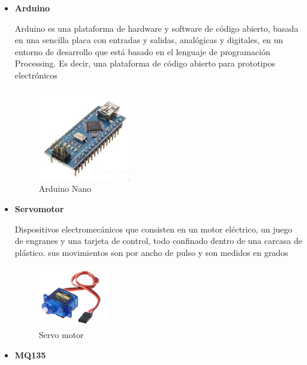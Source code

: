 \documentclass[letterpaper,12pt]{article}
\begin{document}
{\begin{itemize}
\begin{figure}[h]
	\end{figure}


	\item \textbf{Arduino}

	Arduino es una plataforma de hardware y software de código abierto, basada en una sencilla placa con entradas y salidas, analógicas y digitales, en un entorno de desarrollo que está basado en el lenguaje de programación Processing. Es decir, una plataforma de código abierto para prototipos electrónicos
	
	\begin{figure}[h]
		\centering
		\begin{minipage}[t]{5cm}
			\includegraphics[width=4cm]{images/arduino.jpeg}	 %
			\caption{ Arduino Nano}
		\end{minipage}
		
	\end{figure}


	

	\item \textbf{Servomotor}
	
	Dispositivos electromecánicos que consisten en un motor eléctrico, un juego de engranes y una tarjeta de control, todo confinado dentro de una carcasa de plástico. sus movimientos son por ancho de pulso y son medidos en grados

	\begin{figure}[h]
		\centering
		\begin{minipage}[t]{5cm}
			\includegraphics[width=3cm]{images/servo.jpg}	 %
			\caption{ Servo motor}
		\end{minipage}
		
	\end{figure}
	

	\item \textbf{MQ135}
	

\end{itemize}}
\end{document}
